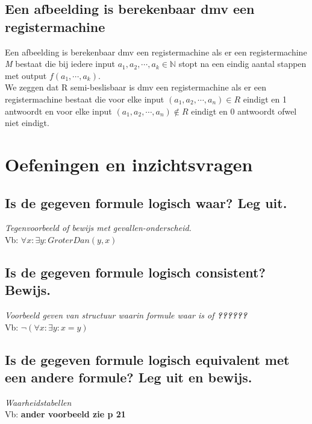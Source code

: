 \documentclass[11pt, a4paper]{article}
\begin{document}
\subsection*{Een afbeelding is berekenbaar dmv een registermachine}
Een afbeelding is berekenbaar dmv een registermachine als er een registermachine \textit{M} bestaat die bij iedere input $a_1, a_2, \cdots, a_k \in \mathbb{N}$ stopt na een eindig aantal stappen met output $f(a_1, \cdots, a_k)$.\\
We zeggen dat R semi-beslisbaar is dmv een registermachine als er een registermachine bestaat die voor elke input $(a_1, a_2, \cdots, a_n) \in \textit{R}$ eindigt en 1 antwoordt en voor elke input $(a_1, a_2, \cdots, a_n) \notin \textit{R}$ eindigt en 0 antwoordt ofwel niet eindigt.

\section*{Oefeningen en inzichtsvragen}
\subsection*{Is de gegeven formule logisch waar? Leg uit.}
\textit{Tegenvoorbeeld of bewijs met gevallen-onderscheid.}\\
Vb: $\forall x: \exists y: GroterDan(y,x)$
\vfill

\subsection*{Is de gegeven formule logisch consistent? Bewijs.}
\textit{Voorbeeld geven van structuur waarin formule waar is of \textbf{??????}}\\
Vb: $\neg (\forall x: \exists y: x=y)$
\vfill
\newpage

\subsection*{Is de gegeven formule logisch equivalent met een andere formule? Leg uit en bewijs.}
\textit{Waarheidstabellen}\\
Vb: \textbf{ander voorbeeld zie p 21}
\vfill
\end{document}
